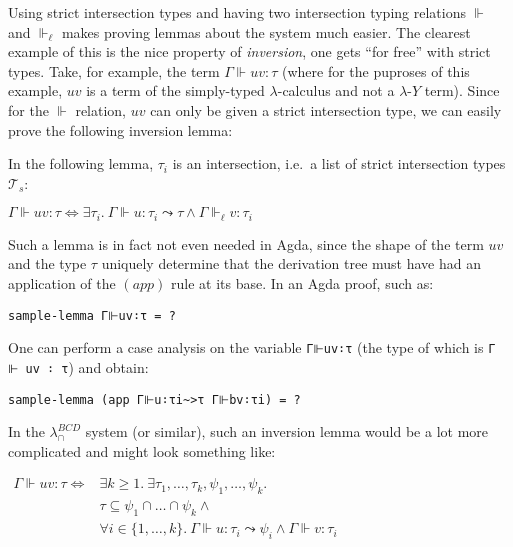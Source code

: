 \documentclass[a4paper, 12pt, twoside]{style/ociamthesis}
\theoremstyle{plain}
\newtheorem{Lemma}{Lemma}[chapter]
\theoremstyle{definition}
\theoremstyle{remark}
\newtheorem*{Remark}{Remark}
\newcommand{\lamy}{\lambda\text{-}Y}
\renewenvironment{Remark}{\begin{OldRemark}\begin{mdframed}[style=example, linecolor=black]}{\end{mdframed}\end{OldRemark}}
\renewenvironment{Lemma}{\begin{OldLemma}\begin{mdframed}[style=example, linecolor=cyan]}{\end{mdframed}\end{OldLemma}}
\begin{document}
\begin{Remark}

Using strict intersection types and having two intersection typing
relations \(\Vdash\) and \(\Vdash_\ell\) makes proving lemmas about the
system much easier. The clearest example of this is the nice property of
\emph{inversion}, one gets ``for free'' with strict types. Take, for
example, the term \(\Gamma \Vdash uv : \tau\) (where for the puproses of
this example, \(uv\) is a term of the simply-typed \(\lambda\)-calculus
and not a \(\lamy\) term). Since for the \(\Vdash\) relation, \(uv\) can
only be given a strict intersection type, we can easily prove the
following inversion lemma:

\begin{Lemma}[Inversion Lemma for $(app)$]

\label{Lemma:invApp} In the following lemma, \(\tau_i\) is an
intersection, i.e.~a list of strict intersection types
\(\mathcal{T}_s\):

\begin{center}
$\Gamma \Vdash uv : \tau \iff \exists \tau_i.\ \Gamma \Vdash u : \tau_i \leadsto \tau \land \Gamma \Vdash_\ell v : \tau_i$
\end{center}

\end{Lemma}

Such a lemma is in fact not even needed in Agda, since the shape of the
term \(uv\) and the type \(\tau\) uniquely determine that the derivation
tree must have had an application of the \((app)\) rule at its base. In
an Agda proof, such as:

\begin{verbatim}
sample-lemma Γ⊩uv∶τ = ?
\end{verbatim}

One can perform a case analysis on the variable \texttt{Γ⊩uv∶τ} (the
type of which is \texttt{Γ ⊩ uv ∶ τ}) and obtain:

\begin{verbatim}
sample-lemma (app Γ⊩u∶τi~>τ Γ⊩bv∶τi) = ?
\end{verbatim}

In the \(\lambda_\cap^{BCD}\) system (or similar), such an inversion
lemma would be a lot more complicated and might look something like:

\begin{center}
$\begin{aligned}
\Gamma \Vdash uv : \tau \iff &\exists k \geq 1.\ \exists \tau_1,\hdots,\tau_k,\psi_1,\hdots,\psi_k.\\
&\tau \subseteq \psi_1 \cap \hdots \cap \psi_k \land\\
&\forall i \in \{1,\hdots,k\}.\ \Gamma \Vdash u : \tau_i \leadsto \psi_i \land \Gamma \Vdash v : \tau_i
\end{aligned}$
\end{center}


\end{Remark}
\end{document}
